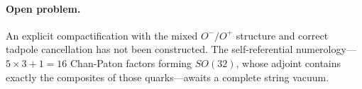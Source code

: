 \paragraph{Open problem.}
An explicit compactification with the mixed $O^-/O^+$ structure
and correct tadpole cancellation has not been constructed.
The self-referential numerology---$5 \times 3 + 1 = 16$
Chan-Paton factors forming $SO(32)$, whose adjoint contains
exactly the composites of those quarks---awaits a complete
string vacuum.
